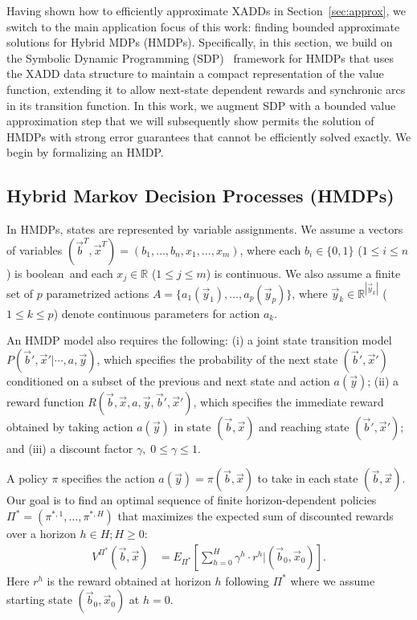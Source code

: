 \label{sec:basdp}

Having shown how to efficiently approximate XADDs in
Section~\ref{sec:approx}, we switch to the main application focus of
this work: finding bounded approximate solutions for Hybrid MDPs
(HMDPs).  Specifically, in this section, we build on the Symbolic
Dynamic Programming (SDP)~\cite{sanner_uai11,zamani12} framework for
HMDPs that uses the XADD data structure to maintain a compact
representation of the value function, extending it to allow next-state
dependent rewards and synchronic arcs in its transition function.  In
this work, we augment SDP with a bounded value approximation step that
we will subsequently show permits the solution of HMDPs with strong
error guarantees that cannot be efficiently solved exactly.  We begin by
formalizing an HMDP.

\subsection{Hybrid Markov Decision Processes (HMDPs) }

In HMDPs, states are represented by variable assignments. We assume a
vectors of variables $(\vec{b}^T,\vec{x}^T) = (
b_1,\ldots,b_n,x_{1},\ldots,x_m )$, where each $b_i \in \{ 0,1 \}$
($1 \leq i \leq n$) is boolean$\,$ and each $x_j \in \mathbb{R}$
($1 \leq j \leq m$) is continuous. We also assume a finite set of $p$
parametrized actions $A = \{ a_1(\vec{y}_1), \ldots,
a_p(\vec{y}_p) \}$, where $\vec{y}_k \in \mathbb{R}^{|\vec{y}_k|}$
($1 \leq k \leq p$) denote continuous parameters for action $a_k$.

An HMDP model also requires the following: (i) a joint state transition
model $P(\vec{b}',\vec{x}'|\cdots,a,\vec{y})$, which specifies the
probability of the next state $(\vec{b}',\vec{x}')$ conditioned on a
subset of the previous and next state and action $a(\vec{y})$; (ii) a
reward function $R(\vec{b},\vec{x},a,\vec{y},\vec{b}',\vec{x}')$,
which specifies the immediate reward obtained by taking action
$a(\vec{y})$ in state $(\vec{b},\vec{x})$ and reaching state
$(\vec{b}',\vec{x}')$; and (iii) a discount factor $\gamma, \;
0 \leq \gamma \leq 1$.

A policy $\pi$ specifies the action $a(\vec{y}) =
\pi(\vec{b},\vec{x})$ to take in each state $(\vec{b},\vec{x})$.  Our
goal is to find an optimal sequence of finite horizon-dependent
policies $\Pi^* = (\pi^{*,1},\ldots,\pi^{*,H})$ that
maximizes the expected sum of discounted rewards over a horizon $h \in
H; H \geq 0$:
\begin{align}
V^{\Pi^*}(\vec{b},\vec{x}) & = E_{\Pi^*} \left[ \sum_{h=0}^{H} \gamma^h \cdot r^h \Big| (\vec{b}_0,\vec{x}_0) \right]. \label{eq:vfun_def}
\end{align}
Here $r^h$ is the reward obtained at horizon $h$ following $\Pi^*$
where we assume starting state $(\vec{b}_0,\vec{x}_0)$ at $h=0$.

